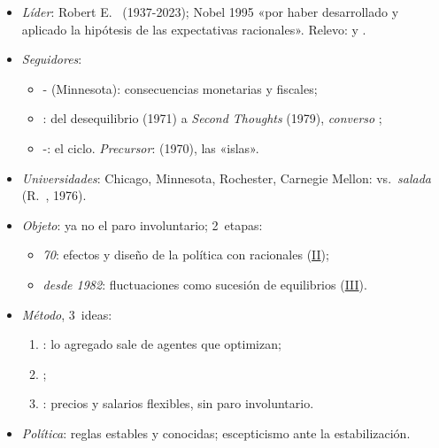 \documentclass{article}
\begin{document}
\begin{columnas}
\begin{itemize}
\item \emph{Líder}: Robert E.\  (1937-2023); Nobel 1995 «por haber desarrollado y aplicado la hipótesis de las expectativas racionales». Relevo:  y .
\item \emph{Seguidores}:
  \begin{itemize}
  \item {}- (Minnesota): consecuencias monetarias y fiscales;
  \item {}: del desequilibrio (1971) a \emph{Second Thoughts} (1979), \emph{converso} ;
  \item {}-: el ciclo. \emph{Precursor}:  (1970), las «islas».
  \end{itemize}
\item \emph{Universidades}: Chicago, Minnesota, Rochester, Carnegie Mellon:  vs.\ \emph{salada} (R.\ , 1976).
\item \emph{Objeto}: ya no el paro involuntario; 2~etapas:
  \begin{itemize}
  \item \emph{70}: efectos y diseño de la política con racionales (\hyperref[rep:II]{II});
  \item \emph{desde 1982}: fluctuaciones como sucesión de equilibrios (\hyperref[rep:III]{III}).
  \end{itemize}
\item \emph{Método}, 3~ideas:
  \begin{enumerate}
  \item {}: lo agregado sale de agentes que optimizan;
  \item {};
  \item {}: precios y salarios flexibles, sin paro involuntario.
  \end{enumerate}
\item \emph{Política}: reglas estables y conocidas; escepticismo ante la estabilización.
\end{itemize}


\end{columnas}
\end{document}
